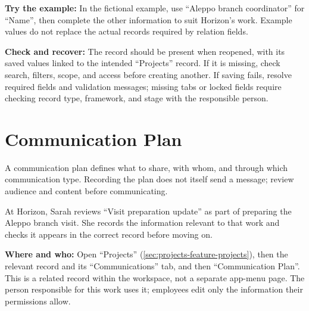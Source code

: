 \textbf{Try the example:} In the fictional example, use “Aleppo branch coordinator” for “Name”, then complete the other information to suit Horizon's work. Example values do not replace the actual records required by relation fields.

\textbf{Check and recover:} The record should be present when reopened, with its saved values linked to the intended “Projects” record. If it is missing, check search, filters, scope, and access before creating another. If saving fails, resolve required fields and validation messages; missing tabs or locked fields require checking record type, framework, and stage with the responsible person.

\clearpage
\section{Communication Plan}
\label{sec:projects-feature-communication-plan}

A communication plan defines what to share, with whom, and through which communication type. Recording the plan does not itself send a message; review audience and content before communicating.

\begin{rcnote}
At Horizon, Sarah reviews “Visit preparation update” as part of preparing the Aleppo branch visit. She records the information relevant to that work and checks it appears in the correct record before moving on.
\end{rcnote}

\textbf{Where and who:} Open “Projects” (\ref{sec:projects-feature-projects}), then the relevant record and its “Communications” tab, and then “Communication Plan”. This is a related record within the workspace, not a separate app-menu page. The person responsible for this work uses it; employees edit only the information their permissions allow.

